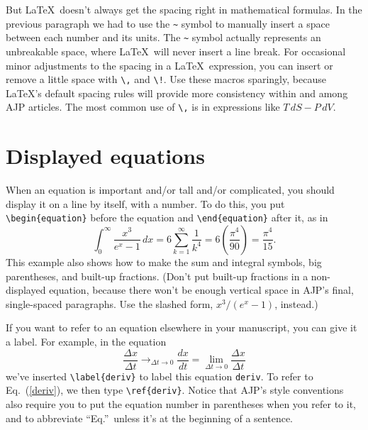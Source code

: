 \documentclass[prb,preprint]{revtex4-1}
\begin{document}
But \LaTeX\ doesn't always get the spacing right in mathematical formulas.
In the previous paragraph we had to use the \verb/~/ symbol to 
manually insert a space between each number and its units.  The \verb/~/
symbol actually represents an unbreakable space, where \LaTeX\ will never
insert a line break. For occasional minor adjustments to the spacing
in a \LaTeX\ expression, you can insert or remove a little 
space with \verb/\,/ and \verb/\!/.  Use these macros sparingly,
because \LaTeX's default spacing rules will provide more consistency
within and among AJP articles.  The most common use of \verb/\,/ 
is in expressions like $T\,dS - P\,dV$.


\section{Displayed equations}
\label{DispEqSection}	%

When an equation is important and/or tall and/or complicated, you should 
display it on a line by itself, with a number. To do this, you put 
\verb/\begin{equation}/ before the equation and \verb/\end{equation}/ 
after it, as in     %
\begin{equation}
\int_0^\infty \! \frac{x^3}{e^x - 1} \, dx = 6\sum_{k=1}^\infty \frac1{k^4} = 
    6\left(\frac{\pi^4}{90}\right) = \frac{\pi^4}{15}.
\end{equation}
This example also shows how to make the sum and integral symbols, big parentheses, 
and built-up fractions.  (Don't put built-up fractions in a 
non-displayed equation, because there won't be enough vertical space in 
AJP's final, single-spaced paragraphs.  Use the slashed form, $x^3/(e^x-1)$, 
instead.)

If you want to refer to an equation elsewhere in your manuscript, you can 
give it a label.  For example, in the equation
\begin{equation}
\label{deriv}
\frac{\Delta x}{\Delta t} \mathop{\longrightarrow}_{\Delta t\rightarrow0} \frac{dx}{dt} 
 = \lim_{\Delta t\rightarrow0} \frac{\Delta x}{\Delta t}
\end{equation}
we've inserted \verb/\label{deriv}/ to label this equation 
\texttt{deriv}.\cite{labelnames}  To refer to 
Eq.~(\ref{deriv}), we then type \verb/\ref{deriv}/.\cite{footnotes}  Notice 
that AJP's style conventions also require you to put the equation number in 
parentheses when you refer to it, and to abbreviate ``Eq.''\ unless it's at 
the beginning of a sentence.
\end{document}
